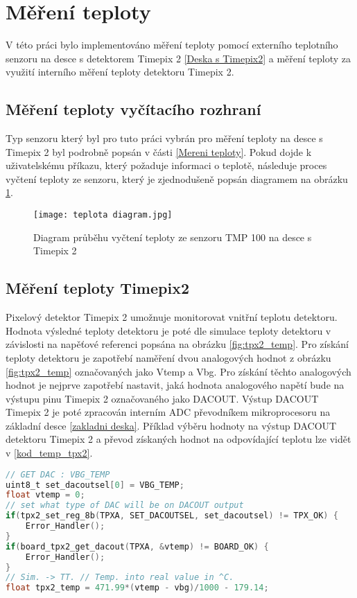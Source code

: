 \section{Měření teploty}
V této práci bylo implementováno měření teploty pomocí externího teplotního senzoru na desce s detektorem Timepix 2 \ref{Deska s Timepix2} a měření teploty za využití interního měření teploty detektoru Timepix 2.
\subsection{Měření teploty vyčítacího rozhraní}
Typ senzoru který byl pro tuto práci vybrán pro měření teploty na desce s Timepix 2 byl podrobně popsán v části \ref{Mereni teploty}. Pokud dojde k uživatelskému příkazu, který požaduje informaci o teplotě, následuje proces vyčtení teploty ze senzoru, který je zjednodušeně popsán diagramem na obrázku \ref{fig:diagram}.
\begin{figure}[h!]
	\centering
	\captionsetup{justification=centering}
	\texttt{[image: teplota diagram.jpg]}
	\caption{Diagram průběhu vyčtení teploty ze senzoru TMP 100 na desce s Timepix 2} 
	\label{fig:diagram}
\end{figure}

\subsection{Měření teploty Timepix2}
Pixelový detektor Timepix 2 umožnuje monitorovat vnitřní teplotu detektoru. Hodnota výsledné teploty detektoru je poté dle simulace teploty detektoru v závislosti na napěťové referenci popsána na obrázku \ref{fig:tpx2_temp}. Pro získání teploty detektoru je zapotřebí naměření dvou analogových hodnot z obrázku \ref{fig:tpx2_temp} označovaných jako Vtemp a Vbg. Pro získání těchto analogových hodnot je nejprve zapotřebí nastavit, jaká hodnota analogového napětí bude na výstupu pinu Timepix 2 označovaného jako DACOUT. Výstup DACOUT Timepix 2 je poté zpracován interním ADC převodníkem mikroprocesoru na základní desce \ref{zakladni deska}. Příklad výběru hodnoty na výstup DACOUT detektoru Timepix 2 a převod získaných hodnot na odpovídající teplotu lze vidět v \ref{kod_temp_tpx2}.
\begin{lstlisting}[frame=single, language=C, caption={Výběr výstupu DACOUT detektoru Timepix2 a odečtení hodnoty detektoru}, label=kod_temp_tpx2]
// GET DAC : VBG_TEMP
uint8_t set_dacoutsel[0] = VBG_TEMP; 
float vtemp = 0;
// set what type of DAC will be on DACOUT output								   
if(tpx2_set_reg_8b(TPXA, SET_DACOUTSEL, set_dacoutsel) != TPX_OK) {    
	Error_Handler();
}
if(board_tpx2_get_dacout(TPXA, &vtemp) != BOARD_OK) {
	Error_Handler();
}
// Sim. -> TT. // Temp. into real value in ^C.
float tpx2_temp = 471.99*(vtemp - vbg)/1000 - 179.14;					
\end{lstlisting}

